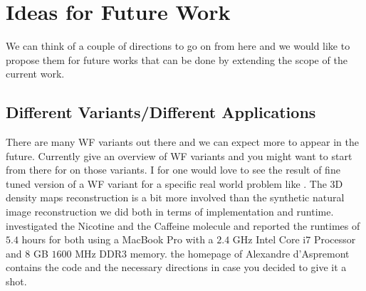 



\section*{Ideas for Future Work}\label{sec:ideas_for_future_work}

We can think of a couple of directions to go on from here and we would like to propose them 
for future works that can be done by extending the scope of the current work.

\subsection*{Different Variants/Different Applications}

There are many \ac{WF}\cite{Jaganathan2015}\cite{Liu2019} variants out there and we can expect more to appear in the future. 
Currently \cite{Jaganathan2015}\cite{Liu2019}\cite{Chandra2017} give an overview of \ac{WF} variants and you might want to start from there for 
\du\cite{Monga2019} on those variants. I for one would love to see the result of fine tuned 
\du\cite{Monga2019} version of a \ac{WF} variant for a specific real world problem like \cite{Fogel2013}. The 3D density maps reconstruction 
is a bit more involved than the synthetic natural image reconstruction we did both in terms of implementation and runtime. \cite{Candes2014} investigated the 
Nicotine and the Caffeine molecule and reported the runtimes of 
$5.4$ hours for both using a MacBook Pro with a $2.4$ GHz Intel Core i$7$ Processor and $8$ GB $1600$ MHz DDR$3$ memory. 
the homepage of Alexandre d'Aspremont contains the code and the necessary directions in case you decided to give it a shot.

